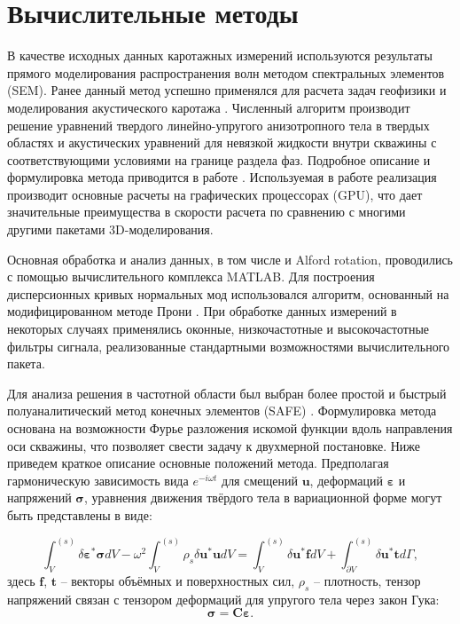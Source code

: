 \documentclass[a4paper,11pt]{article}
\begin{document}
\section{Вычислительные методы}

В качестве исходных данных каротажных измерений используются результаты прямого моделирования распространения волн методом спектральных элементов (SEM). Ранее данный метод успешно применялся для расчета задач геофизики \cite{Komatitsch1999} и моделирования акустического каротажа \cite{Charara2011}. Численный алгоритм производит решение уравнений твердого линейно-упругого анизотропного тела в твердых областях и акустических уравнений для невязкой жидкости внутри скважины с соответствующими условиями на границе раздела фаз. Подробное описание и формулировка метода приводится в работе \cite{Komatitsch1999}. Используемая в работе реализация производит основные расчеты на графических процессорах (GPU), что дает значительные преимущества в скорости расчета по сравнению с многими другими пакетами 3D-моделирования.

Основная обработка и анализ данных, в том числе и Alford rotation, проводились с помощью вычислительного комплекса MATLAB. Для построения дисперсионных кривых нормальных мод использовался алгоритм, основанный на модифицированном методе Прони \cite{Ekstrom1995}. При обработке данных измерений в некоторых случаях применялись оконные, низкочастотные и высокочастотные фильтры сигнала, реализованные стандартными возможностями вычислительного пакета.   

Для анализа решения в частотной области был выбран более простой и быстрый полуаналитический метод конечных элементов (SAFE) \cite{Bartoli2006}. Формулировка метода основана на возможности Фурье разложения искомой функции вдоль направления оси скважины, что позволяет свести задачу к двухмерной постановке. Ниже приведем краткое описание основные положений метода. Предполагая гармоническую зависимость вида $e^{-i\omega t}$ для смещений $\mathbf{u}$, деформаций $\boldsymbol{\varepsilon}$ и напряжений $\boldsymbol{\sigma}$, уравнения движения твёрдого тела в вариационной форме могут быть представлены в виде:

\begin{equation}
\int_{V}^{(s)}\delta \boldsymbol{\varepsilon}^* \boldsymbol{\sigma} dV - \omega^2 \int_{V}^{(s)} \rho_s \delta \mathbf{u}^*\mathbf{u}dV = \int_{V}^{(s)}\delta \mathbf{u}^* \mathbf{f} dV + \int_{\partial V}^{(s)}\delta \mathbf{u}^* \mathbf{t} d\Gamma, \label{var_eq_solid}
\end{equation}
здесь $\mathbf{f}$, $\mathbf{t}$ -- векторы объёмных и поверхностных сил, $\rho_s$ -- плотность, тензор напряжений связан с тензором деформаций для упругого тела через закон Гука:
$$
\boldsymbol{\sigma} = \mathbf{C}\boldsymbol{\varepsilon}.
$$
\end{document}
